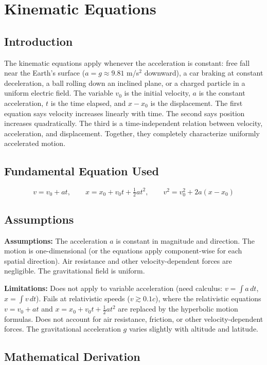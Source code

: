 \chapter{Kinematic Equations}

\section*{Introduction}

The kinematic equations apply whenever the acceleration is constant: free fall near the Earth's surface ($a = g \approx 9.81$ m/s$^2$ downward), a car braking at constant deceleration, a ball rolling down an inclined plane, or a charged particle in a uniform electric field. The variable $v_0$ is the initial velocity, $a$ is the constant acceleration, $t$ is the time elapsed, and $x - x_0$ is the displacement. The first equation says velocity increases linearly with time. The second says position increases quadratically. The third is a time-independent relation between velocity, acceleration, and displacement. Together, they completely characterize uniformly accelerated motion.
\section*{Fundamental Equation Used}

\[
v = v_0 + at,\qquad x = x_0 + v_0 t + \tfrac{1}{2}at^2,\qquad v^2 = v_0^2 + 2a(x - x_0)
\]
\section*{Assumptions}

\textbf{Assumptions:} The acceleration $a$ is constant in magnitude and direction. The motion is one-dimensional (or the equations apply component-wise for each spatial direction). Air resistance and other velocity-dependent forces are negligible. The gravitational field is uniform.


\textbf{Limitations:} Does not apply to variable acceleration (need calculus: $v = \int a\,dt$, $x = \int v\,dt$). Fails at relativistic speeds ($v \gtrsim 0.1c$), where the relativistic equations $v = v_0 + at$ and $x = x_0 + v_0 t + \frac{1}{2}at^2$ are replaced by the hyperbolic motion formulas. Does not account for air resistance, friction, or other velocity-dependent forces. The gravitational acceleration $g$ varies slightly with altitude and latitude.


\section*{Mathematical Derivation}

